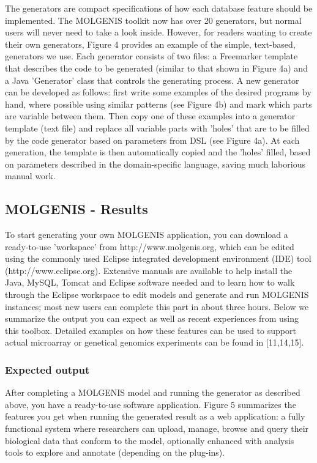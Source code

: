 \documentclass[8pt, twoside, a5paper]{report}
\begin{document}
The generators are compact specifications of how each database feature should be implemented. The MOLGENIS toolkit now has 
over 20 generators, but normal users will never need to take a look inside. However, for readers wanting to create their own 
generators, Figure 4 provides an example of the simple, text-based, generators we use. Each generator consists of two files: 
a Freemarker template that describes the code to be generated (similar to that shown in Figure 4a) and a Java 'Generator' 
class that controls the generating process. A new generator can be developed as follows: first write some examples of the 
desired programs by hand, where possible using similar patterns (see Figure 4b) and mark which parts are variable between 
them. Then copy one of these examples into a generator template (text file) and replace all variable parts with 'holes' that 
are to be filled by the code generator based on parameters from DSL (see Figure 4a). At each generation, the template is then 
automatically copied and the 'holes' filled, based on parameters described in the domain-specific language, saving much 
laborious manual work. 

\subsection{MOLGENIS - Results}

To start generating your own MOLGENIS application, you can download a ready-to-use 'workspace' from http://www.molgenis.org, 
which can be edited using the commonly used Eclipse integrated development environment (IDE) tool (http://www.eclipse.org). 
Extensive manuals are available to help install the Java, MySQL, Tomcat and Eclipse software needed and to learn how to walk 
through the Eclipse workspace to edit models and generate and run MOLGENIS instances; most new users can complete this part 
in about three hours. Below we summarize the output you can expect as well as recent experiences from using this toolbox. 
Detailed examples on how these features can be used to support actual microarray or genetical genomics experiments can be 
found in [11,14,15].

\subsubsection{Expected output}

After completing a MOLGENIS model and running the generator as described above, you have a ready-to-use software application. 
Figure 5 summarizes the features you get when running the generated result as a web application: a fully functional system 
where researchers can upload, manage, browse and query their biological data that conform to the model, optionally enhanced 
with analysis tools to explore and annotate (depending on the plug-ins).
\end{document}
